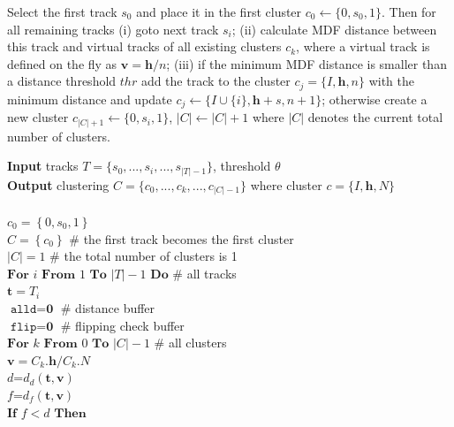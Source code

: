 \documentclass[preprint,authoryear,a4paper,10pt,onecolumn]{elsarticle}
\begin{document}
Select the first track $s_{0}$ and place it in the first cluster
$c_{0}\leftarrow\{0,s_{0},1\}$. Then for all remaining tracks (i)
goto next track $s_{i}$; (ii) calculate MDF distance between this
track and virtual tracks of all existing clusters $c_{k}$, where
a virtual track is defined on the fly as $\mathbf{v}=\mathbf{h}/n$;
(iii) if the minimum MDF distance is smaller than a distance threshold
$\mathrm{\mathit{thr}}$ add the track to the cluster $c_{j}=\{I,\mathbf{h},n\}$
with the minimum distance and update $c_{j}\leftarrow\{I\cup\{i\},\mathbf{h}+s,n+1\}$;
otherwise create a new cluster $c_{|C|+1}\leftarrow\{0,s_{i},1\}$,
$|C|\leftarrow|C|+1$ where $|C|$ denotes the current total number
of clusters. 

%
\begin{algorithm}
\textbf{Input} tracks $T=\{s_{0},...,s_{i},...,s_{|T|-1}\}$, threshold $\theta $\\
\textbf{Output} clustering $C=\{c_{0},...,c_{k},...,c_{|C|-1}\}$ where cluster $c=\{I,\mathbf{h},N\}$\\
\\
$c_{0}=\left\{0,s_{0},1\right\}$\\
$C=\left\{c_{0}\right\}$ \# the first track becomes the first cluster\\
$|C|=1$ \# the total number of clusters is 1 \\
$\textbf{For}$ $i$ $\textbf{From}$ $1$ $\textbf{To}$ $|T|-1$ $\textbf{Do}$ \# all tracks\\
\hspace*{2em} $\textbf{t}=T_{i}$\\
\hspace*{2em} $\texttt{alld}=\textbf{0}$ \# distance buffer\\
\hspace*{2em} $\texttt{flip}=\textbf{0}$ \# flipping check buffer\\
\hspace*{2em} $\textbf{For}$ $k$ $\textbf{From}$ $0$ $\textbf{To}$ $|C|-1$ \# all clusters\\
\hspace*{4em} $\mathbf{v}=C_{k}.\mathbf{h}/C_{k}.N$\\ 
\hspace*{4em} $d$=$d_{d}(\mathbf{t},\mathbf{v})$\\
\hspace*{4em} $f$=$d_{f}(\mathbf{t},\mathbf{v})$\\
\hspace*{4em} $\textbf{If}$ $f < d$ $\textbf{Then}$\\

\end{algorithm}
\end{document}
